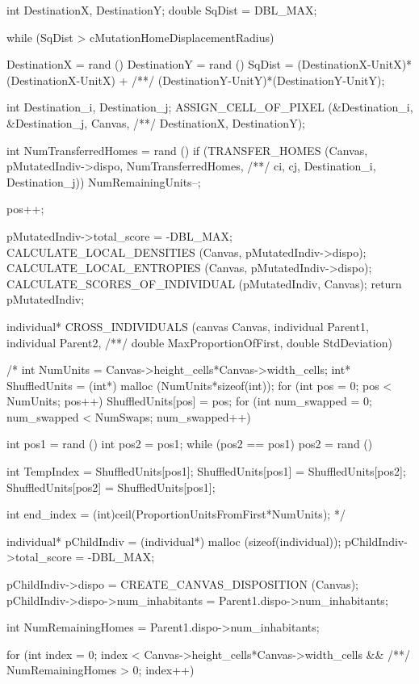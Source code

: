 \begin{C}
{{{			int DestinationX, DestinationY;
			double SqDist = DBL_MAX;
			
			while (SqDist > cMutationHomeDisplacementRadius){
				
				DestinationX = rand () %
				DestinationY = rand () %
				SqDist = (DestinationX-UnitX)*(DestinationX-UnitX) +
				/**/ (DestinationY-UnitY)*(DestinationY-UnitY);
			}
			int Destination_i, Destination_j;
			ASSIGN_CELL_OF_PIXEL (&Destination_i, &Destination_j, Canvas,
			/**/ DestinationX, DestinationY);
			
			int NumTransferredHomes = rand () %
			if (TRANSFER_HOMES (Canvas, pMutatedIndiv->dispo, NumTransferredHomes,
			/**/ ci, cj, Destination_i, Destination_j)){
				NumRemainingUnits--;
			}
		}
		pos++;
	}
	pMutatedIndiv->total_score = -DBL_MAX;
	CALCULATE_LOCAL_DENSITIES (Canvas, pMutatedIndiv->dispo);
	CALCULATE_LOCAL_ENTROPIES (Canvas, pMutatedIndiv->dispo);
	CALCULATE_SCORES_OF_INDIVIDUAL (pMutatedIndiv, Canvas);
	return pMutatedIndiv;
}


individual* CROSS_INDIVIDUALS (canvas Canvas, individual Parent1, individual Parent2,
/**/ double MaxProportionOfFirst, double StdDeviation){
	
	/* int NumUnits = Canvas->height_cells*Canvas->width_cells;
	int* ShuffledUnits = (int*) malloc (NumUnits*sizeof(int));
	for (int pos = 0; pos < NumUnits; pos++){
		ShuffledUnits[pos] = pos;
	}
	for (int num_swapped = 0; num_swapped < NumSwaps; num_swapped++){
		
		int pos1 = rand () %
		int pos2 = pos1;
		while (pos2 == pos1){
			pos2 = rand () %
		}
		
		int TempIndex = ShuffledUnits[pos1];
		ShuffledUnits[pos1] = ShuffledUnits[pos2];
		ShuffledUnits[pos2] = ShuffledUnits[pos1];
	}
	
	int end_index = (int)ceil(ProportionUnitsFromFirst*NumUnits); */
	
	individual* pChildIndiv = (individual*) malloc (sizeof(individual));
	pChildIndiv->total_score = -DBL_MAX;
	
	pChildIndiv->dispo = CREATE_CANVAS_DISPOSITION (Canvas);
	pChildIndiv->dispo->num_inhabitants = Parent1.dispo->num_inhabitants;
	
	int NumRemainingHomes = Parent1.dispo->num_inhabitants;
	
	for (int index = 0; index < Canvas->height_cells*Canvas->width_cells &&
	/**/ NumRemainingHomes > 0; index++){
		
}}
\end{C}
